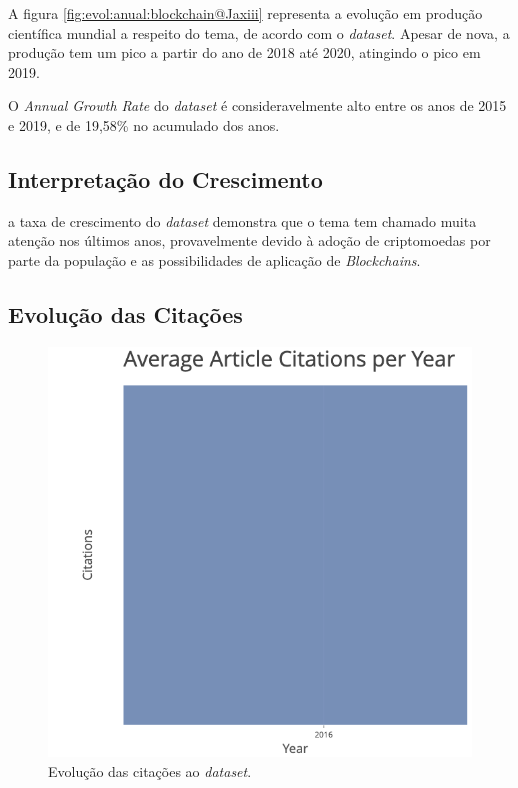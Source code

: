 A figura \ref{fig:evol:anual:blockchain@Jaxiii} representa a evolução em produção científica mundial a respeito do tema, de acordo com o \textit{dataset}. Apesar de nova, a produção tem um pico a partir do ano de 2018 até 2020, atingindo o pico em 2019. 

O \textit{Annual Growth Rate} do \textit{dataset} é consideravelmente alto entre os anos de 2015 e 2019, e de 19,58\% no acumulado dos anos.

\subsection{Interpretação do Crescimento} a taxa de crescimento do \textit{dataset} demonstra que o tema tem chamado muita atenção nos últimos anos, provavelmente devido à 
adoção de criptomoedas por parte da população e as possibilidades de aplicação de \textit{Blockchains}.

\subsection{Evolução das Citações}

\begin{figure}
    \centering
    \includegraphics[angle=0,width=1\textwidth]{experiments/Jaxiii/PesquisaBibliometrica/Blockchains/citations-year-plot.png}
    \caption{Evolução das citações ao \textit{dataset}.}
    \label{fig:evol:anual:citacoes:blockchain@Jaxiii}
\end{figure}

